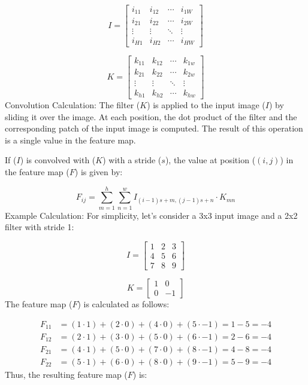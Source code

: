 \documentclass{article}
\begin{document}
\[ I = \begin{bmatrix} i_{11} & i_{12} & \cdots & i_{1W} \\ i_{21} & i_{22} & \cdots & i_{2W} \\ \vdots & \vdots & \ddots & \vdots \\ i_{H1} & i_{H2} & \cdots & i_{HW} \end{bmatrix} \]

\[ K = \begin{bmatrix} k_{11} & k_{12} & \cdots & k_{1w} \\ k_{21} & k_{22} & \cdots & k_{2w} \\ \vdots & \vdots & \ddots & \vdots \\ k_{h1} & k_{h2} & \cdots & k_{hw} \end{bmatrix} \]
%
Convolution Calculation:
The filter ($K$) is applied to the input image ($I$) by sliding it over the image. At each position, the dot product of the filter and the corresponding patch of the input image is computed. The result of this operation is a single value in the feature map.

If ($I$) is convolved with ($K$) with a stride ($s$), the value at position ($(i, j)$) in the feature map ($F$) is given by:

\[ F_{ij} = \sum_{m=1}^{h} \sum_{n=1}^{w} I_{(i-1)s+m, (j-1)s+n} \cdot K_{mn} 
\]
%
Example Calculation:
For simplicity, let's consider a 3x3 input image and a 2x2 filter with stride 1:

\[ I = \begin{bmatrix} 1 & 2 & 3 \\ 4 & 5 & 6 \\ 7 & 8 & 9 \end{bmatrix} \]

\[ K = \begin{bmatrix} 1 & 0 \\ 0 & -1 \end{bmatrix} \]
%
The feature map ($F$) is calculated as follows:

\begin{align*}
F_{11} &= (1 \cdot 1) + (2 \cdot 0) + (4 \cdot 0) + (5 \cdot -1) = 1 - 5 = -4 \\
F_{12} &= (2 \cdot 1) + (3 \cdot 0) + (5 \cdot 0) + (6 \cdot -1) = 2 - 6 = -4 \\
F_{21} &= (4 \cdot 1) + (5 \cdot 0) + (7 \cdot 0) + (8 \cdot -1) = 4 - 8 = -4 \\
F_{22} &= (5 \cdot 1) + (6 \cdot 0) + (8 \cdot 0) + (9 \cdot -1) = 5 - 9 = -4
\end{align*}
Thus, the resulting feature map ($F$) is:
\end{document}
